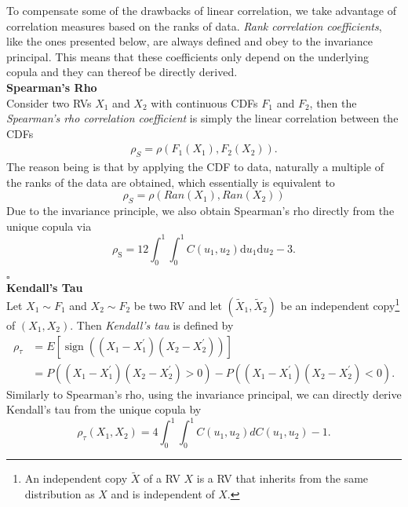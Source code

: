 
To compensate some of the drawbacks of linear correlation, we take advantage of correlation measures based on the ranks of data. \textit{Rank correlation coefficients}, like the ones presented below, are always defined and obey to the invariance principal. This means that these coefficients only depend on the underlying copula and they can thereof be directly derived.\\

\textbf{Spearman's Rho}\\
Consider two \acp{RV} $X_1$ and $X_2$ with continuous \acp{CDF} $F_1$ and $F_2$, then the \textit{Spearman's rho correlation coefficient} is simply the linear correlation between the \acp{CDF}
\begin{align}
\rho_{S}=\rho\left(F_{1}\left(X_{1}\right), F_{2}\left(X_{2}\right)\right).
\end{align}
The reason being is that by applying the \ac{CDF} to data, naturally a multiple of the ranks of the data are obtained, which essentially is equivalent to
\begin{equation}
\rho_S = \rho ( Ran(X_1), Ran(X_2) )
\end{equation}
Due to the invariance principle, we also obtain Spearman's rho directly from the unique copula via
\begin{equation}
\rho_{\mathrm{S}}=12 \int_{0}^{1} \int_{0}^{1} C\left(u_{1}, u_{2}\right) \mathrm{d} u_{1} \mathrm{d} u_{2}-3.
\end{equation}

\hfill $\square$ \\


\textbf{Kendall's Tau}\\
Let $X_1 \sim F_1$ and $X_2 \sim F_2$ be two \ac{RV} and let $(\tilde{X}_{1}, \tilde{X}_{2})$ be an independent copy\footnote{An independent copy $\tilde{X}$ of a RV $X$ is a RV that inherits from the same distribution as $X$ and is independent of $X$.} of $({X}_{1}, {X}_{2})$. Then \textit{Kendall's tau} is defined by 
\begin{equation}
\begin{aligned}
\rho_{\tau} &={E}\left[\operatorname{sign}\left(\left(X_{1}-X_{1}^{\prime}\right)\left(X_{2}-X_{2}^{\prime}\right)\right)\right] \\
&={P}\left(\left(X_{1}-X_{1}^{\prime}\right)\left(X_{2}-X_{2}^{\prime}\right)>0\right)-{P}\left(\left(X_{1}-X_{1}^{\prime}\right)\left(X_{2}-X_{2}^{\prime}\right)<0\right).
\end{aligned}
\end{equation}
Similarly to Spearman's rho, using the invariance principal, we can directly derive Kendall's tau from the unique copula by
\begin{equation}
\rho_{\tau}\left(X_{1}, X_{2}\right)=4 \int_{0}^{1} \int_{0}^{1} C\left(u_{1}, u_{2}\right) d C\left(u_{1}, u_{2}\right)-1.
\end{equation}

